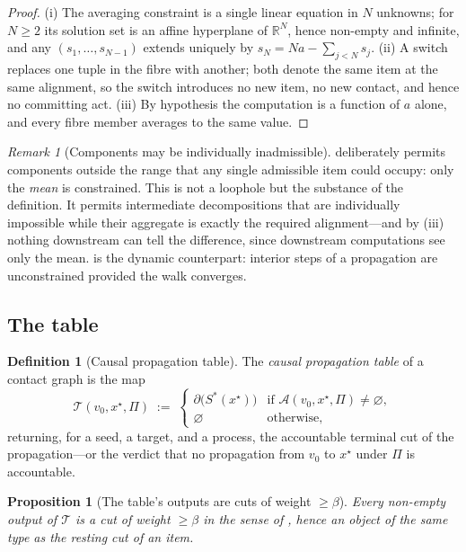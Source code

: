 \documentclass[11pt,twocolumn,a4paper]{article}
\theoremstyle{dirthm}
\newtheorem{proposition}[theorem]{Proposition}
\theoremstyle{definition}
\newtheorem{definition}[theorem]{Definition}
\theoremstyle{remark}
\newtheorem{remark}[theorem]{Remark}
\newcommand{\R}{\mathbb{R}}
\newcommand{\flo}{\beta}
\newcommand{\cut}{\partial}
\newcommand{\al}{a}
\newcommand{\Proc}{\Pi}
\newcommand{\Tab}{\mathcal{T}}
\newcommand{\acc}{\mathcal{A}}
\begin{document}
\begin{proof}
(i) The averaging constraint is a single linear equation in $N$ unknowns;
for $N\ge2$ its solution set is an affine hyperplane of $\R^{N}$, hence
non-empty and infinite, and any $(s_1,\dots,s_{N-1})$ extends uniquely by
$s_N=N\al-\sum_{j<N}s_j$. (ii) A switch replaces one tuple in the fibre with
another; both denote the same item at the same alignment, so the switch
introduces no new item, no new contact, and hence no committing act. (iii) By
hypothesis the computation is a function of $\al$ alone, and every fibre
member averages to the same value.
\end{proof}

\begin{remark}[Components may be individually inadmissible]
\label{rem:virtual-components}
 deliberately permits components outside the range
that any single admissible item could occupy: only the \emph{mean} is
constrained. This is not a loophole but the substance of the definition. It
permits intermediate decompositions that are individually impossible while
their aggregate is exactly the required alignment---and by
(iii) nothing downstream can tell the difference, since
downstream computations see only the mean.  is the
dynamic counterpart: interior steps of a propagation are unconstrained
provided the walk converges.
\end{remark}

\subsection{The table}

\begin{definition}[Causal propagation table]
\label{def:table}
The \emph{causal propagation table} of a contact graph is the map
\[
\Tab(v_0,x^{\star},\Proc)\;:=\;
\begin{cases}
\cut\bigl(S^{\ast}(x^{\star})\bigr) & \text{if }\acc(v_0,x^{\star},\Proc)\neq\varnothing,\\[2pt]
\varnothing & \text{otherwise,}
\end{cases}
\]
returning, for a seed, a target, and a process, the accountable terminal cut
of the propagation---or the verdict that no propagation from $v_0$ to
$x^{\star}$ under $\Proc$ is accountable.
\end{definition}

\begin{proposition}[The table's outputs are cuts of weight $\ge\flo$]
\label{prop:table-type}
Every non-empty output of $\Tab$ is a cut of weight $\ge\flo$ in the sense of
, hence an object of the same type as the resting cut of an
item.
\end{proposition}
\end{document}
